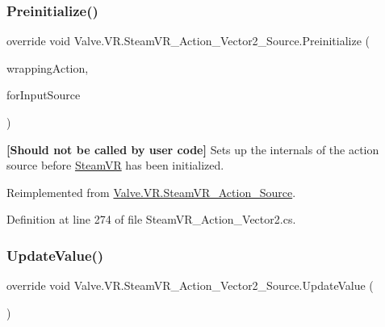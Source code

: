 \mbox{\label{class_valve_1_1_v_r_1_1_steam_v_r___action___vector2___source_aca501fd21acaec4eb089bdf652adf20c}} 
\subsubsection{\texorpdfstring{Preinitialize()}{Preinitialize()}}
{\footnotesize\ttfamily override void Valve.\+V\+R.\+Steam\+V\+R\+\_\+\+Action\+\_\+\+Vector2\+\_\+\+Source.\+Preinitialize (\begin{DoxyParamCaption}\item[{\mbox{\hyperlink{class_valve_1_1_v_r_1_1_steam_v_r___action}{Steam\+V\+R\+\_\+\+Action}}}]{wrapping\+Action,  }\item[{\mbox{\hyperlink{namespace_valve_1_1_v_r_a82e5bf501cc3aa155444ee3f0662853f}{Steam\+V\+R\+\_\+\+Input\+\_\+\+Sources}}}]{for\+Input\+Source }\end{DoxyParamCaption})\hspace{0.3cm}{\ttfamily [virtual]}}



{\bfseries{\mbox{[}Should not be called by user code\mbox{]}}} Sets up the internals of the action source before \mbox{\hyperlink{class_valve_1_1_v_r_1_1_steam_v_r}{Steam\+VR}} has been initialized. 



Reimplemented from \mbox{\hyperlink{class_valve_1_1_v_r_1_1_steam_v_r___action___source_aa2bec7f32b37595de01f1456a3fa5bfe}{Valve.\+V\+R.\+Steam\+V\+R\+\_\+\+Action\+\_\+\+Source}}.



Definition at line 274 of file Steam\+V\+R\+\_\+\+Action\+\_\+\+Vector2.\+cs.

\mbox{\label{class_valve_1_1_v_r_1_1_steam_v_r___action___vector2___source_a5bfd4e989ac2e24bc474506d4312dafa}} 
\subsubsection{\texorpdfstring{UpdateValue()}{UpdateValue()}}
{\footnotesize\ttfamily override void Valve.\+V\+R.\+Steam\+V\+R\+\_\+\+Action\+\_\+\+Vector2\+\_\+\+Source.\+Update\+Value (\begin{DoxyParamCaption}{ }\end{DoxyParamCaption})\hspace{0.3cm}{\ttfamily [virtual]}}




